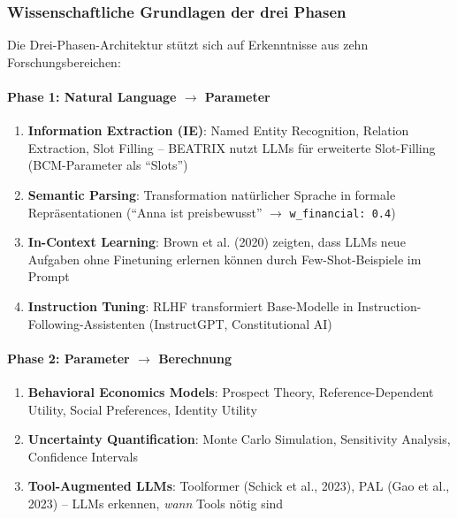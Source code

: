 \subsubsection{Wissenschaftliche Grundlagen der drei Phasen}

Die Drei-Phasen-Architektur stützt sich auf Erkenntnisse aus zehn Forschungsbereichen:

\paragraph{Phase 1: Natural Language $\rightarrow$ Parameter}

\begin{enumerate}
    \item \textbf{Information Extraction (IE)}: Named Entity Recognition, Relation Extraction, Slot Filling -- BEATRIX nutzt LLMs für erweiterte Slot-Filling (BCM-Parameter als ``Slots'')

    \item \textbf{Semantic Parsing}: Transformation natürlicher Sprache in formale Repräsentationen (``Anna ist preisbewusst'' $\rightarrow$ \texttt{w\_financial: 0.4})

    \item \textbf{In-Context Learning}: Brown et al. (2020) zeigten, dass LLMs neue Aufgaben ohne Finetuning erlernen können durch Few-Shot-Beispiele im Prompt

    \item \textbf{Instruction Tuning}: RLHF transformiert Base-Modelle in Instruction-Following-Assistenten (InstructGPT, Constitutional AI)
\end{enumerate}

\paragraph{Phase 2: Parameter $\rightarrow$ Berechnung}

\begin{enumerate}
    \item \textbf{Behavioral Economics Models}: Prospect Theory, Reference-Dependent Utility, Social Preferences, Identity Utility

    \item \textbf{Uncertainty Quantification}: Monte Carlo Simulation, Sensitivity Analysis, Confidence Intervals

    \item \textbf{Tool-Augmented LLMs}: Toolformer (Schick et al., 2023), PAL (Gao et al., 2023) -- LLMs erkennen, \textit{wann} Tools nötig sind
\end{enumerate}

